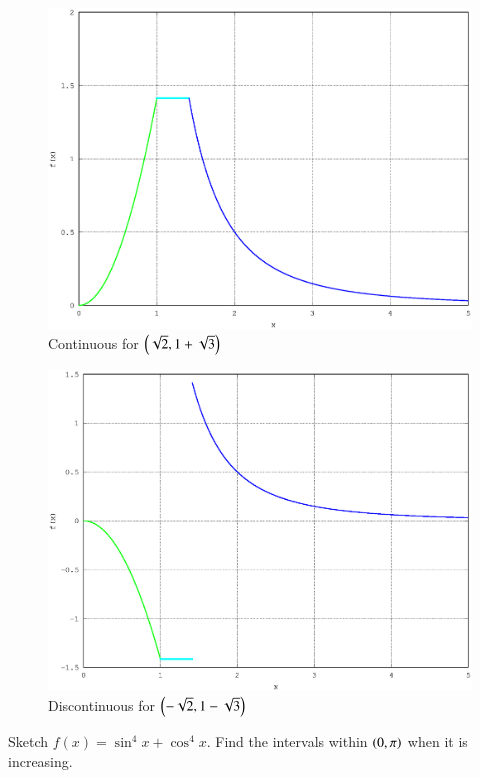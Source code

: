 \documentclass[journal,12pt,twocolumn]{IEEEtran}
\begin{document}
\begin{figure}[h]
\centering
\includegraphics[width=\columnwidth]{./version_2/ee16b1019/ee16b1019c}
\caption{ Continuous for $\left(\sqrt{2}, 1 + \sqrt{3}\right)$}
\end{figure}
%
\begin{figure}[h]
\centering
\includegraphics[width=\columnwidth]{./version_2/ee16b1019/ee16b1019d}
\caption{ Discontinuous for $\left(-\sqrt{2}, 1 - \sqrt{3}\right)$}
\end{figure}
%
\renewcommand{\thefigure}{\theproblem}
\begin{problem}
Sketch $f(x) = \sin^4x + \cos^4x$. Find the intervals within $\left(0,\pi\right)$ when it is increasing.
\end{problem}
\end{document}
